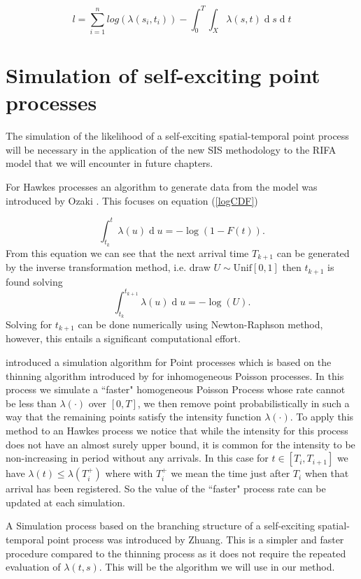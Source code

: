 \documentclass[11pt,a4paper]{article}
\renewcommand{\d}[1]{\ensuremath{\operatorname{d}\!{#1}}}
\begin{document}
\begin{equation*}
    l = \sum_{i=1}^n log(\lambda(s_i, t_i)) - \int_0^T\int_X \lambda(s,t) \d s \d t
\end{equation*}

\section{Simulation of self-exciting point processes}

The simulation of the likelihood of a self-exciting spatial-temporal point process will be necessary in the application of the new SIS methodology to the RIFA model that we will encounter in future chapters.

For Hawkes processes an algorithm to generate data from the model was introduced by Ozaki \cite{Ozaki}. This focuses on equation (\ref{logCDF})

\begin{equation*}
    \int_{t_k}^t \lambda (u) \d u = - \log(1 - F(t)).
\end{equation*}
From this equation we can see that the next arrival time $T_{k+1}$ can be generated by the inverse transformation method, i.e. draw $U \sim \text{Unif}[0, 1]$ then $t_{k+1}$ is found solving 
\begin{equation*}
    \int_{t_k}^{t_{k+1}} \lambda(u) \d u = - \log (U).
\end{equation*}
Solving for $t_{k+1}$ can be done numerically using Newton-Raphson method, however, this entails a significant computational effort.

\cite{Ogata81} introduced a simulation algorithm for Point processes which is based on the thinning algorithm introduced by \cite{Lewis} for inhomogeneous Poisson processes. In this process we simulate a ``faster" homogeneous Poisson Process whose rate cannot be less than $\lambda(\cdot)$ over $[0,T]$,  we then remove point probabilistically in such a way that the remaining points satisfy the intensity function $\lambda(\cdot)$.
To apply this method to an Hawkes process we notice that while the intensity for this process does not have an almost surely upper bound, it is common for the intensity to be non-increasing in period without any arrivals. In this case for $t \in [T_i, T_{i+1}]$ we have $\lambda(t) \leq \lambda (T^+_i)$ where with $T^+_i$ we mean the time just after $T_i$ when that arrival has been registered. So the value of the ``faster" process rate can be updated at each simulation.

A Simulation process based on the branching structure of a self-exciting spatial-temporal point process was introduced by Zhuang\cite{Zhuang}. This is a simpler and faster procedure compared to the thinning process as it does not require the repeated evaluation of $\lambda(t, s)$. This will be the algorithm we will use in our method.
\end{document}
